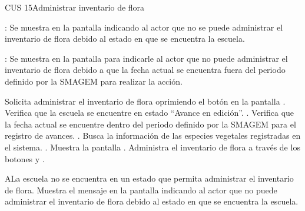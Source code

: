 \begin{UseCase}{CUS 15}{Administrar inventario de flora}
{\begin{UClist}
        \UCli {}: Se muestra en la pantalla  indicando al actor que no se puede administrar el inventario de flora debido al estado en que se encuentra la escuela.
        
        \UCli {}: Se muestra en la pantalla  para indicarle al actor que no puede administrar el inventario de flora debido a que la fecha actual se encuentra fuera del periodo definido por la SMAGEM para realizar la acción.
    \end{UClist}
    }


\end{UseCase}

 \begin{UCtrayectoria}
    \UCpaso[\UCactor] Solicita administrar el inventario de flora oprimiendo el botón \botReg en la pantalla .
    \UCpaso[\UCsist] Verifica que la escuela se encuentre en estado ``Avance en edición''. .
    \UCpaso[\UCsist] Verifica que la fecha actual se encuentre dentro del periodo definido por la SMAGEM para el registro de avances. .
    \UCpaso[\UCsist] Busca la información de las especies vegetales registradas en el sistema. .
    \UCpaso[\UCsist] Muestra la pantalla .
    \UCpaso[\UCactor] Administra el inventario de flora a través de los botones  y \botKo  . \label{cus15:Registrar}
 \end{UCtrayectoria}
 
 \begin{UCtrayectoriaA}{A}{La escuela no se encuentra en un estado que permita administrar el inventario de flora.}
    \UCpaso[\UCsist] Muestra el mensaje  en la pantalla  indicando al actor que no puede administrar el inventario de flora debido al estado en que se encuentra la escuela.
 \end{UCtrayectoriaA}
 
